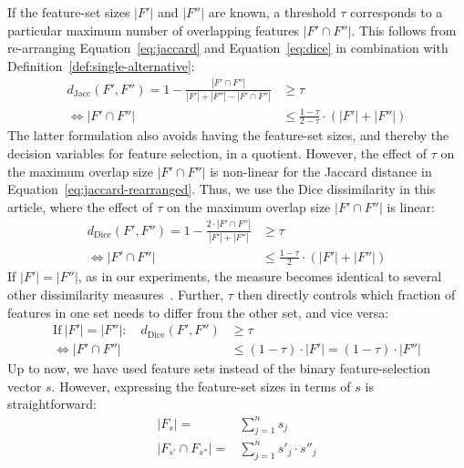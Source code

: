 \documentclass{article}
\theoremstyle{definition}
\begin{document}
If the feature-set sizes $|F'|$ and $|F''|$ are known, a threshold $\tau$ corresponds to a particular maximum number of overlapping features $|F' \cap F''|$.
This follows from re-arranging Equation~\ref{eq:jaccard} and Equation~\ref{eq:dice} in combination with Definition~\ref{def:single-alternative}:
%
\begin{equation}
	\begin{aligned}
		d_{\text{Jacc}}(F',F'') = 1 - \frac{|F' \cap F''|}{|F'| + |F''| - |F' \cap F''|} &\geq \tau \\
		\Leftrightarrow |F' \cap F''| &\leq \frac{1 - \tau}{2 - \tau} \cdot (|F'| + |F''|)
		\end{aligned}
	\label{eq:jaccard-rearranged}
\end{equation}
%
The latter formulation also avoids having the feature-set sizes, and thereby the decision variables for feature selection, in a quotient.
However, the effect of $\tau$ on the maximum overlap size $|F' \cap F''|$ is non-linear for the Jaccard distance in Equation~\ref{eq:jaccard-rearranged}.
Thus, we use the Dice dissimilarity in this article, where the effect of $\tau$ on the maximum overlap size $|F' \cap F''|$ is linear:
%
\begin{equation}
	\begin{aligned}
		d_{\text{Dice}}(F',F'') = 1 - \frac{2 \cdot |F' \cap F''|}{|F'| + |F''|} &\geq \tau \\
		\Leftrightarrow |F' \cap F''| &\leq \frac{1 - \tau}{2} \cdot (|F'| + |F''|)
	\end{aligned}
	\label{eq:dice-rearranged}
\end{equation}
%
If $|F'| = |F''|$, as in our experiments, the measure becomes identical to several other dissimilarity measures~\cite{egghe2009new}.
Further, $\tau$ then directly controls which fraction of features in one set needs to differ from the other set, and vice versa:
%
\begin{equation}
	\begin{aligned}
		\text{If}~|F'| = |F''|: \quad d_{\text{Dice}}(F',F'') &\geq \tau \\
		\Leftrightarrow |F' \cap F''| &\leq (1 - \tau) \cdot |F'| = (1 - \tau) \cdot |F''|
	\end{aligned}
	\label{eq:dice-rearranged-equal-size}
\end{equation}
%
Up to now, we have used feature sets instead of the binary feature-selection vector $s$.
However, expressing the feature-set sizes in terms of $s$ is straightforward:
%
\begin{equation}
	\begin{aligned}
		|F_s| =& \sum_{j=1}^n s_j \\
		|F_{s'} \cap F_{s''}| =& \sum_{j=1}^n s'_j \cdot s''_j
	\end{aligned}
	\label{eq:feature-set-size}
\end{equation}
\end{document}
